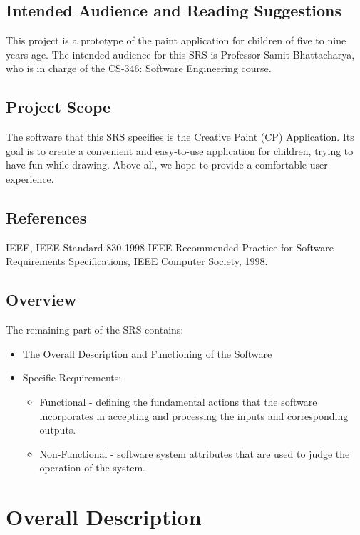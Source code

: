 \documentclass{scrreprt}
\begin{document}
\section{Intended Audience and Reading Suggestions}
This project is a prototype of the paint application for children of five to nine years age. The intended audience for this SRS is Professor Samit Bhattacharya, who is in charge of the CS-346: Software Engineering course. 

\section{Project Scope}
The software that this SRS specifies is the Creative Paint (CP) Application. Its goal is to create a convenient and easy-to-use application for children, trying to have fun while drawing. Above all, we hope to provide a comfortable user experience.

\section{References}
IEEE, IEEE Standard 830-1998 IEEE Recommended Practice for Software Requirements Specifications, IEEE Computer Society, 1998.

\section{Overview}
The remaining part of the SRS contains:
\begin{itemize}[itemsep=0.5pt]
    \item The Overall Description and Functioning of the Software
    \item Specific Requirements:
        \begin{itemize}[itemsep=0.5pt]
            \item Functional - defining the fundamental actions that the software incorporates in accepting and processing the inputs and corresponding outputs.
            \item Non-Functional - software system attributes that are used
            to judge the operation of the system.
        \end{itemize}
\end{itemize}

\chapter{Overall Description}
\end{document}
